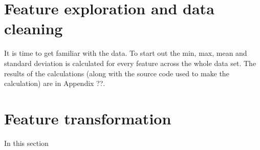 \section{Feature exploration and data cleaning} %
\label{sec:data_cleaning_and_feature_exploration}

It is time to get familiar with the data. To start out the min, max, mean and standard deviation is calculated for every feature across the whole data set. The results of the calculations (along with the source code used to make the calculation) are in Appendix ??. 



\section{Feature transformation} %
\label{sec:feature_transformation}

In this section

